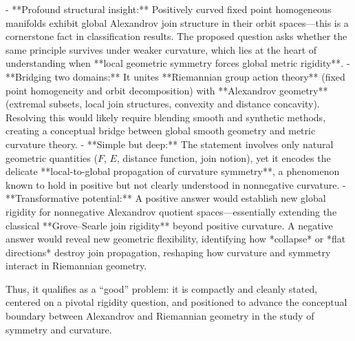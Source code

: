 - **Profound structural insight:** Positively curved fixed point homogeneous manifolds exhibit global Alexandrov join structure in their orbit spaces—this is a cornerstone fact in classification results. The proposed question asks whether the same principle survives under weaker curvature, which lies at the heart of understanding when **local geometric symmetry forces global metric rigidity**.  
- **Bridging two domains:** It unites **Riemannian group action theory** (fixed point homogeneity and orbit decomposition) with **Alexandrov geometry** (extremal subsets, local join structures, convexity and distance concavity). Resolving this would likely require blending smooth and synthetic methods, creating a conceptual bridge between global smooth geometry and metric curvature theory.  
- **Simple but deep:** The statement involves only natural geometric quantities (\(F\), \(E\), distance function, join notion), yet it encodes the delicate **local-to-global propagation of curvature symmetry**, a phenomenon known to hold in positive but not clearly understood in nonnegative curvature.  
- **Transformative potential:** A positive answer would establish new global rigidity for nonnegative Alexandrov quotient spaces—essentially extending the classical **Grove–Searle join rigidity** beyond positive curvature. A negative answer would reveal new geometric flexibility, identifying how *collapse* or *flat directions* destroy join propagation, reshaping how curvature and symmetry interact in Riemannian geometry.

Thus, it qualifies as a “good” problem: it is compactly and cleanly stated, centered on a pivotal rigidity question, and positioned to advance the conceptual boundary between Alexandrov and Riemannian geometry in the study of symmetry and curvature.